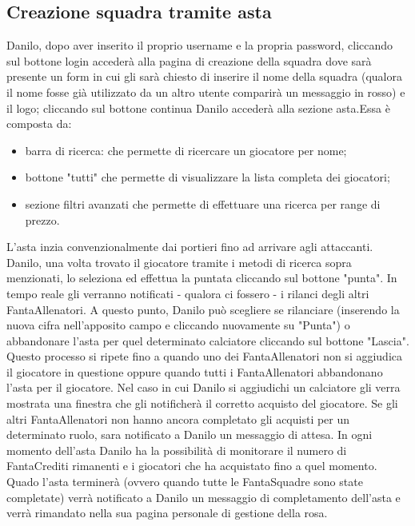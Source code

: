\documentclass[12pt,a4paper]{article}
\begin{document}
\subsection{Creazione squadra tramite asta}
Danilo, dopo aver inserito il proprio username e la propria password, cliccando sul bottone login accederà alla pagina di creazione della squadra dove sarà presente un form in cui gli sarà chiesto di inserire il nome della squadra (qualora il nome fosse già utilizzato da un altro utente comparirà un messaggio in rosso) e il logo; cliccando sul bottone continua Danilo accederà alla sezione asta.Essa è composta da:
\begin{itemize}
\item barra di ricerca: che permette di ricercare un giocatore per nome;
\item bottone "tutti" che permette di visualizzare la lista completa dei giocatori;
\item sezione filtri avanzati che permette di effettuare una ricerca per range di prezzo.
\end{itemize}
L'asta inzia convenzionalmente dai portieri fino ad arrivare agli attaccanti. Danilo, una volta trovato il giocatore tramite i metodi di ricerca sopra menzionati, lo seleziona ed effettua la puntata cliccando sul bottone "punta". In tempo reale gli verranno notificati - qualora ci fossero - i rilanci degli altri FantaAllenatori. A questo punto, Danilo può scegliere se rilanciare (inserendo la nuova cifra nell'apposito campo e cliccando nuovamente su "Punta") o abbandonare l'asta per quel determinato calciatore cliccando sul bottone "Lascia". Questo processo si ripete fino a quando uno dei FantaAllenatori non si aggiudica il giocatore in questione oppure quando tutti i FantaAllenatori abbandonano l'asta per il giocatore. Nel caso in cui Danilo si aggiudichi un calciatore gli verra mostrata una finestra che gli notificherà il corretto acquisto del giocatore. Se gli altri FantaAllenatori non hanno ancora completato gli acquisti per un determinato ruolo, sara notificato a Danilo un messaggio di attesa. In ogni momento dell'asta Danilo ha la possibilità di monitorare il numero di FantaCrediti rimanenti e i giocatori che ha acquistato fino a quel momento. Quado l'asta terminerà (ovvero quando tutte le FantaSquadre sono state completate) verrà notificato a Danilo un messaggio di completamento dell'asta e verrà rimandato nella sua pagina personale di gestione della rosa.
\end{document}
